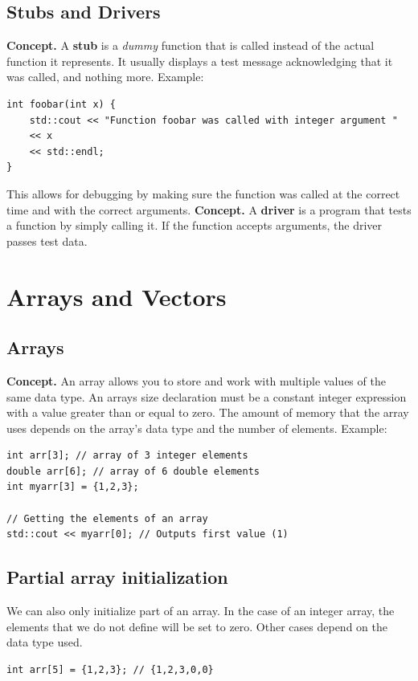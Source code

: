 \documentclass{report}
\begin{document}
    \subsection{Stubs and Drivers}
    \bigbreak \noindent 
    \textbf{Concept.} A \textbf{stub} is a \textit{dummy} function that is called instead of the actual function it represents. It usually displays a test message acknowledging that it was called, and nothing more.
    \bigbreak \noindent 
    Example:
    \bigbreak \noindent 
    \sepline
    \begin{verbatim}
int foobar(int x) {
    std::cout << "Function foobar was called with integer argument " 
    << x 
    << std::endl;
}
    \end{verbatim}
    \sepline
    \bigbreak \noindent 
    This allows for debugging by making sure the function was called at the correct time and with the correct arguments.
    \bigbreak \noindent 
    \textbf{Concept.} A \textbf{driver} is a program that tests a function by simply calling it. If the function accepts arguments, the driver passes test data.

    \pagebreak \bigbreak \noindent 
    \section{\LARGE Arrays and Vectors}
    \bigbreak \noindent 
    \subsection{Arrays}
    \bigbreak \noindent 
    \textbf{Concept.} An array allows you to store and work with multiple values of the same data type. An arrays size declaration must be a constant integer expression with a value greater than or equal to zero. The amount of memory that the array uses depends on the array's data type and the number of elements.
    \bigbreak \noindent 
    Example:
    \bigbreak \noindent 
    \sepline
    \begin{verbatim}
int arr[3]; // array of 3 integer elements
double arr[6]; // array of 6 double elements
int myarr[3] = {1,2,3};

// Getting the elements of an array
std::cout << myarr[0]; // Outputs first value (1)
    \end{verbatim}
    \sepline
    \bigbreak \noindent 
    \bigbreak \noindent 

   \bigbreak \noindent 
   \subsection{Partial array initialization}
   \bigbreak \noindent 
   We can also only initialize part of an array. In the case of an integer array, the elements that we do not define will be set to zero. Other cases depend on the data type used.
   \bigbreak \noindent 
   \sepline
   \begin{verbatim}
int arr[5] = {1,2,3}; // {1,2,3,0,0}
   \end{verbatim}
   \sepline
\end{document}
